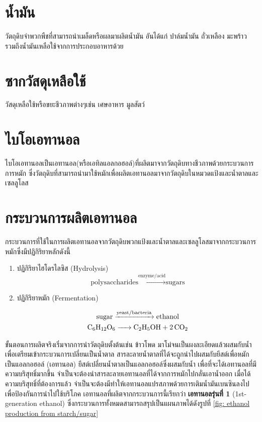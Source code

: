 \documentclass[a4paper,nobib,openany,10pt]{tufte-book}
\begin{document}
\section{น้ำมัน}
\label{sec:orgf5b1a25}
วัตถุดิบจำพวกพืชที่สามารถนำเมล็ดหรือผลมาผลิตน้ำมัน อันได้แก่ ปาล์มน้ำมัน
ถั่วเหลือง มะพร้าว รวมถึงน้ำมันเหลือใช้จากการประกอบอาหารด้วย

\section{ซากวัสดุเหลือใช้}
\label{sec:org35ac1ba}
วัสดุเหลือใช้หรือขยะชีวภาพต่างๆเช่น เศษอาหาร มูลสัตว์

\section{ไบโอเอทานอล}
\label{sec:org7244500}
ไบโอเอทานอลเป็นเอทานอล(หรือเอทิลแอลกอฮอล์)ที่ผลิตมาจากวัตถุดิบทางชีวภาพด้วยกระบวนการการหมัก
ซึ่งวัตถุดิบที่สามารถนำมาใช้หมักเพื่อผลิตเอทานอลมาจากวัตถุดิบในหมวดแป้งและน้ำตาลและเซลลูโลส

\section{กระบวนการผลิตเอทานอล}
\label{sec:org78c95ce}
กระบวนการที่ใช้ในการผลิตเอทานอลจากวัตถุดิบพวกแป้งและน้ำตาลและเซลลูโลสมาจากกระบวนการหมักซึ่งมีปฏิกิริยาหลักดังนี้

\begin{enumerate}
\item ปฏิกิริยาไฮโดรไลซิส (Hydrolysis)
\[\text{polysaccharides} \xrightarrow{\text{enzyme/acid}} \text{sugars}\]

\item ปฏิกิริยาหมัก (Fermentation)

\begin{gather*}
\label{eq: fermentation polysac}
  \text{sugar} \xrightarrow{\text{yeast/bacteria}} \text{ethanol} \\
  \ce{C6H12O6 -> C2H5OH + 2 CO2}
\end{gather*}
\end{enumerate}

ขั้นตอนการผลิตจริงเริ่มจากการนำวัตถุดิบตั้งต้นเช่น ข้าวโพด
มาโม่จนเป็นผงละเอียดแล้วผสมกับน้ำเพื่อเตรียมเข้ากระบวนการเปลี่ยนเป็นน้ำตาล
สารละลายน้ำตาลที่ได้จะถูกนำไปผสมกับยีสต์เพื่อหมักเป็นแอลกอฮอล์ (เอทานอล)
ยีสต์เปลี่ยนน้ำตาลเป็นแอลกอฮอล์ซึ่งผสมกับน้ำ
เพื่อที่จะได้เอทานอลที่มีความบริสุทธิ์มากขึ้น
จำเป็นจะต้องนำสารละลายเอทานอลที่ได้จากการหมักไปกลั่นเอาน้ำออก
เมื่อได้ความบริสุทธิ์ที่ต้องการแล้ว
จำเป็นจะต้องมีทำให้เอทานอลแปรสภาพด้วยการเติมน้ำมันเบนซินลงไปเพื่อป้องกันการนำไปใช้บริโภค
เอทานอลที่ผลิตจากกระบวนการนี้เรียกว่า \textbf{เอทานอลรุ่นที่ 1} (1st-generation
ethanol) ซึ่งกระบวนการทั้งหมดสามารถสรุปเป็นแผนภาพได้ดังรูปที่
\ref{fig: ethanol production from starch/sugar}
\end{document}
